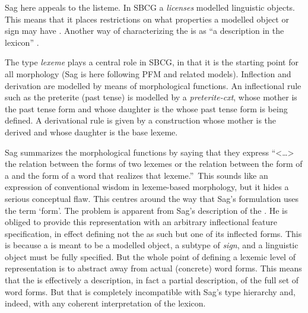 \documentclass[output=paper]{langsci/langscibook}
\begin{document}
\noindent
Sag here appeals to the  listeme. In SBCG a  \emph{licenses} modelled linguistic objects. This  means  that it places restrictions on what properties a modelled object or sign may have . Another way of characterizing the  is as \textquotedblleft a  description in the lexicon\textquotedblright{} .

The type \textit{lexeme} plays a central role in SBCG, in that it is the starting point for all morphology (Sag is here following PFM and related models). Inflection and derivation are modelled by means of morphological functions. An inflectional rule such as the  preterite (past tense) is modelled by a \textit{preterite-cxt}, whose mother is the past tense form and whose daughter is the  whose past tense form is being defined. A derivational rule is given by a construction whose mother is the derived  and whose daughter is the base lexeme.

Sag summarizes the morphological functions by saying  that they express \textquotedblleft <\ldots{}> the relation between the forms of two lexemes or the relation between the form of a  and the form of a word that realizes that lexeme.\textquotedblright\ This sounds like an expression of conventional wisdom in lexeme-based morphology, but it hides a serious conceptual flaw. This  centres around the way that Sag's formulation uses the term `form'. The problem is apparent from Sag's description of the  . He is obliged to provide this representation with an arbitrary inflectional feature specification, in effect defining not the  as such but one of its inflected forms. This is because a  is meant to be a modelled object, a subtype of \textit{sign}, and a linguistic object must be fully specified. But the whole point of defining a lexemic level of representation is to abstract away from actual (concrete) word forms. This means that the  is effectively a description, in fact a partial description, of the full set of word forms. But that is completely incompatible with Sag's type hierarchy and, indeed, with any coherent interpretation of the  lexicon.
\end{document}
